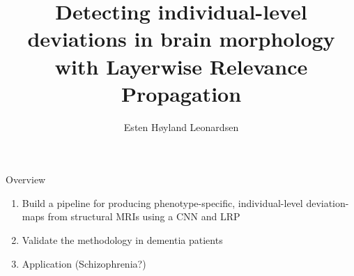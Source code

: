 \documentclass[c]{beamer}
\author{Esten H{\o}yland Leonardsen}
\title{Detecting individual-level deviations in brain morphology with Layerwise Relevance Propagation}
\begin{document}
	\begin{frame} %
		\maketitle
	\end{frame}

	\begin{frame}{Overview}
		\begin{enumerate}
			\item Build a pipeline for producing phenotype-specific, individual-level deviation-maps from structural MRIs using a CNN and LRP
			\item Validate the methodology in dementia patients
			\item Application (Schizophrenia?)
		\end{enumerate}
	\end{frame}
\end{document}

